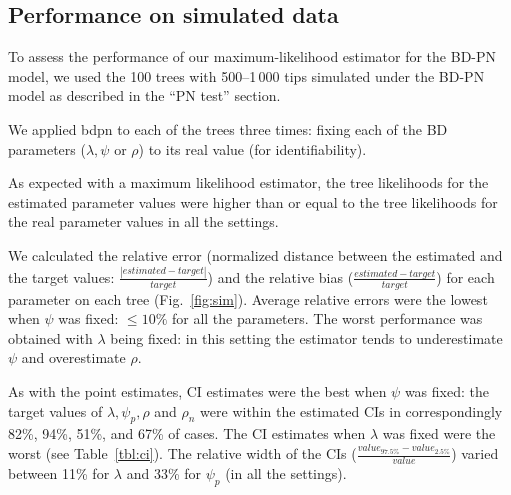 \documentclass[a4paper,10pt]{article}
\begin{document}
\subsection{Performance on simulated data}

To assess the performance of our maximum-likelihood estimator for the BD-PN model, we used the 100 trees with 500--1\,000 tips simulated under the BD-PN model as described in the ``PN test'' section.

We applied bdpn to each of the trees three times: fixing each of the BD parameters ($\lambda,\psi$ or $\rho$) to its real value (for identifiability). 


As expected with a maximum likelihood estimator, the tree likelihoods for the estimated parameter values were higher than or equal to the tree likelihoods for the real parameter values in all the settings.

We calculated the relative error (normalized distance between the estimated and the target values: $\frac{|estimated - target|}{target}$) and the relative bias ($\frac{estimated - target}{target}$) for each parameter on each tree (Fig.~\ref{fig:sim}). 
Average relative errors were the lowest when $\psi$ was fixed: $\leq 10\%$  for all the parameters. The worst performance was obtained with $\lambda$ being fixed: in this setting the estimator tends to underestimate $\psi$ and overestimate $\rho$.

As with the point estimates, CI estimates were the best when $\psi$ was fixed: the target values of $\lambda, \psi_p, \rho$ and $\rho_n$ were within the estimated CIs in correspondingly 82\%, 94\%, 51\%, and 67\% of cases. The CI estimates when $\lambda$ was fixed were the worst (see Table~\ref{tbl:ci}). The relative width of the CIs ($\frac{value_{97.5\%} - value_{2.5\%}}{value}$) varied between 11\% for $\lambda$ and 33\% for $\psi_p$ (in all the settings).
\end{document}
